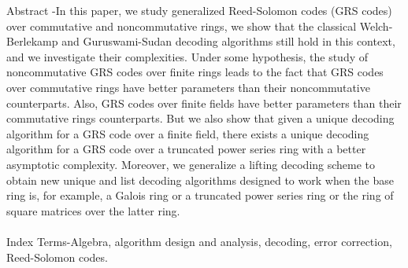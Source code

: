 \documentclass[fontsize=12pt]{article}
\begin{document}
Abstract -In this paper, we study generalized Reed-Solomon
codes (GRS codes) over commutative and noncommutative
rings, we show that the classical Welch-Berlekamp and Guruswami-Sudan
decoding algorithms still hold in this context,
and we investigate their complexities. Under some hypothesis, the
study of noncommutative GRS codes over finite rings leads to the
fact that GRS codes over commutative rings have better parameters
than their noncommutative counterparts. Also, GRS codes
over finite fields have better parameters than their commutative
rings counterparts. But we also show that given a unique decoding
algorithm for a GRS code over a finite field, there exists a unique
decoding algorithm for a GRS code over a truncated power series
ring with a better asymptotic complexity. Moreover, we generalize
a lifting decoding scheme to obtain new unique and list decoding
algorithms designed to work when the base ring is, for example, a
Galois ring or a truncated power series ring or the ring of square
matrices over the latter ring.
\paragraph{}
Index Terms-Algebra, algorithm design and analysis, decoding,
error correction, Reed-Solomon codes.


 
\end{document}
